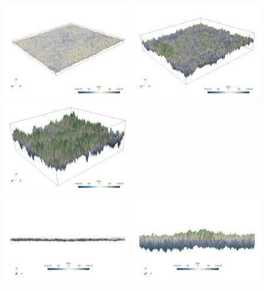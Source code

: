 \begin{center}
\includegraphics[width=5.7cm]{python_codes/fieldstone_56/results/topo010_3d}
\includegraphics[width=5.7cm]{python_codes/fieldstone_56/results/topo050_3d}
\includegraphics[width=5.7cm]{python_codes/fieldstone_56/results/topo100_3d}\\
\includegraphics[width=5.7cm]{python_codes/fieldstone_56/results/topo010}
\includegraphics[width=5.7cm]{python_codes/fieldstone_56/results/topo050}

\end{center}

